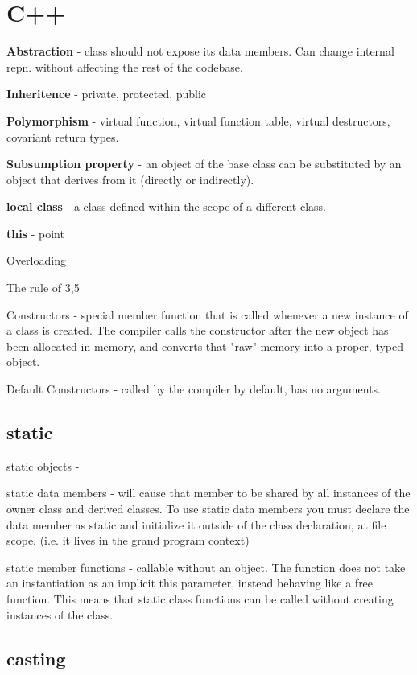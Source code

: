 \section{C++}


\textbf{Abstraction} - class should not expose its data members. Can change internal repn. without affecting the rest of the codebase.

\textbf{Inheritence} - private, protected, public

\textbf{Polymorphism} - virtual function, virtual function table, virtual destructors, covariant return types.
\textbf{}

\textbf{Subsumption property} - an object of the base class can be substituted by an object that derives from it (directly or indirectly).

\textbf{local class} - a class defined within the scope of a different class.

\textbf{this} -  point

Overloading

The rule of 3,5

Constructors - special member function that is called whenever a new instance of a class is created. The compiler calls the constructor after the new object has been allocated in memory, and converts that "raw" memory into a proper, typed object. 

Default Constructors - called by the compiler by default, has no arguments.

\subsection{static}

static objects - 

static data members -  will cause that member to be shared by all instances of the owner class and derived classes. To use static data members you must declare the data member as static and initialize it outside of the class declaration, at file scope. (i.e. it lives in the grand program context)

static member functions - callable without an object. The function does not take an instantiation as an implicit this parameter, instead behaving like a free function. This means that static class functions can be called without creating instances of the class.

\subsection{casting}

